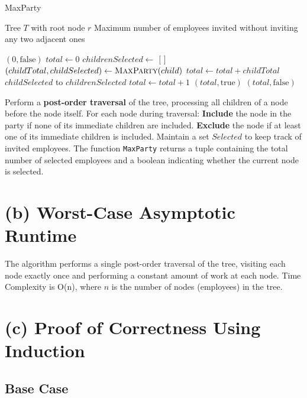 \documentclass[12pt]{article}
\begin{document}
\begin{algorithm}
\caption{MaxParty}
\begin{algorithmic}[1]
\Require Tree $T$ with root node $r$
\Ensure Maximum number of employees invited without inviting any two adjacent ones

        \State \Return $(0, \text{false})$
    \EndIf
    \State $total \gets 0$
    \State $childrenSelected \gets$ $[$ $]$
        \State $(childTotal, childSelected) \gets \Call{MaxParty}{child}$
        \State $total \gets total + childTotal$
        \State {} $childSelected$ to $childrenSelected$
    \EndFor
        \State $total \gets total + 1$
        \State \Return $(total, \text{true})$
    \Else
        \State \Return $(total, \text{false})$
    \EndIf
\EndFunction
\end{algorithmic}
\end{algorithm}

Perform a \textbf{post-order traversal} of the tree, processing all children of a node before the node itself. For each node during traversal: \textbf{Include} the node in the party if none of its immediate children are included. \textbf{Exclude} the node if at least one of its immediate children is included. Maintain a set $Selected$ to keep track of invited employees. The function \texttt{MaxParty} returns a tuple containing the total number of selected employees and a boolean indicating whether the current node is selected.


\section*{(b) Worst-Case Asymptotic Runtime}

The algorithm performs a single post-order traversal of the tree, visiting each node exactly once and performing a constant amount of work at each node. Time Complexity is O(n), where \( n \) is the number of nodes (employees) in the tree.

\section*{(c) Proof of Correctness Using Induction}

\subsection*{Base Case}
\end{document}
